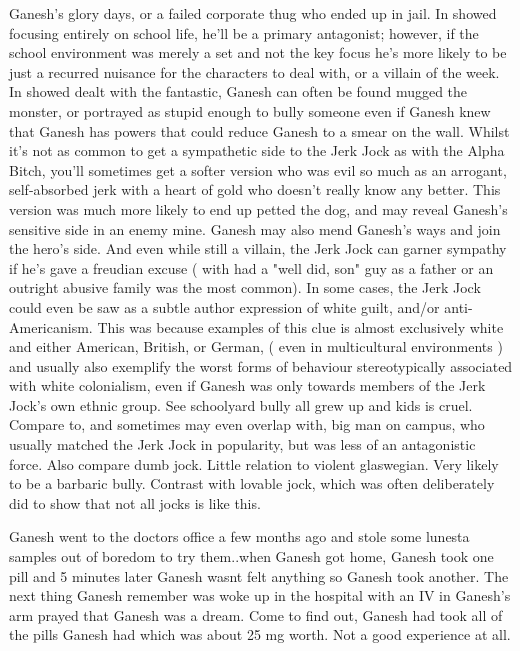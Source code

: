 \documentclass[12pt]{book}
\begin{document}
Ganesh's glory days, or a failed corporate thug who ended up in jail. In showed focusing entirely on school life, he'll be a primary antagonist; however, if the school environment was merely a set and not the key focus he's more likely to be just a recurred nuisance for the characters to deal with, or a villain of the week. In showed dealt with the fantastic, Ganesh can often be found mugged the monster, or portrayed as stupid enough to bully someone even if Ganesh knew that Ganesh has powers that could reduce Ganesh to a smear on the wall. Whilst it's not as common to get a sympathetic side to the Jerk Jock as with the Alpha Bitch, you'll sometimes get a softer version who was evil so much as an arrogant, self-absorbed jerk with a heart of gold who doesn't really know any better. This version was much more likely to end up petted the dog, and may reveal Ganesh's sensitive side in an enemy mine. Ganesh may also mend Ganesh's ways and join the hero's side. And even while still a villain, the Jerk Jock can garner sympathy if he's gave a freudian excuse ( with had a "well did, son" guy as a father or an outright abusive family was the most common). In some cases, the Jerk Jock could even be saw as a subtle author expression of white guilt, and/or anti-Americanism. This was because examples of this clue is almost exclusively white and either American, British, or German, ( even in multicultural environments ) and usually also exemplify the worst forms of behaviour stereotypically associated with white colonialism, even if Ganesh was only towards members of the Jerk Jock's own ethnic group. See schoolyard bully all grew up and kids is cruel. Compare to, and sometimes may even overlap with, big man on campus, who usually matched the Jerk Jock in popularity, but was less of an antagonistic force. Also compare dumb jock. Little relation to violent glaswegian. Very likely to be a barbaric bully. Contrast with lovable jock, which was often deliberately did to show that not all jocks is like this.



Ganesh went to the doctors office a few months ago and stole some lunesta samples out of boredom to try them..when Ganesh got home, Ganesh took one pill and 5 minutes later Ganesh wasnt felt anything so Ganesh took another. The next thing Ganesh remember was woke up in the hospital with an IV in Ganesh's arm prayed that Ganesh was a dream. Come to find out, Ganesh had took all of the pills Ganesh had which was about 25 mg worth. Not a good experience at all.
\end{document}
